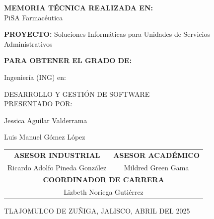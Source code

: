 \documentclass[12pt,letterpaper,spanish, xcolor=table]{report}
\numberwithin{figure}{subsection}
\begin{document}
\begin{center}
	
\large{\textbf{MEMORIA TÉCNICA REALIZADA EN:}}
 \\ PiSA Farmacéutica

\centerline{\hbox{}}

\large{\textbf{PROYECTO:} Soluciones Informáticas para Unidades de Servicios Administrativos}

\vspace{0.1in}
\large{\textbf{PARA OBTENER EL GRADO DE:}}

\large{Ingeniería (ING) en:}
\vspace{0.05in}

\large{DESARROLLO Y GESTIÓN DE SOFTWARE}
\\
\large{PRESENTADO POR:}

Jessica Aguilar Valderrama %

Luis Manuel Gómez López %

\vspace{0.2in}

\begin{tabular}{cc}
	\vspace{0.2in}
	\textbf{ASESOR INDUSTRIAL} & \textbf{ASESOR ACADÉMICO} \\
	
	Ricardo Adolfo Pineda González & Mildred Green Gama\\
	\multicolumn{2}{c}{\textbf{COORDINADOR DE CARRERA}
	\vspace{0.2in}
	} \\
	
	\multicolumn{2}{c}{
			Lizbeth Noriega Gutiérrez }
	\end{tabular}
	
\end{center}
\begin{flushright}\small{ TLAJOMULCO DE ZUÑIGA, JALISCO, ABRIL DEL 2025} \end{flushright}

\newpage




\end{document}
